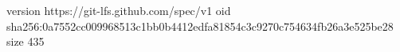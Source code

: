 version https://git-lfs.github.com/spec/v1
oid sha256:0a7552cc009968513c1bb0b4412edfa81854c3c9270c754634fb26a3e525be28
size 435
